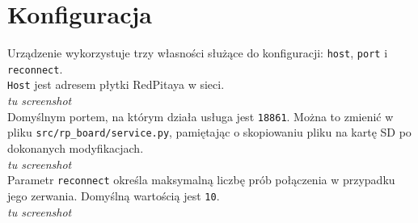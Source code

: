 \documentclass[12pt,a4paper]{article}
\begin{document}
	\section{Konfiguracja}
	Urządzenie wykorzystuje trzy własności służące do konfiguracji: \texttt{host}, \texttt{port} i \texttt{reconnect}.\\
	\texttt{Host} jest adresem płytki RedPitaya w sieci.\\
	\emph{tu screenshot}\\
	Domyślnym portem, na którym działa usługa jest \texttt{18861}. Można to zmienić w pliku \texttt{src/rp\_board/service.py}, pamiętając o skopiowaniu pliku na kartę SD po dokonanych modyfikacjach.\\
	\emph{tu screenshot}\\
	Parametr \texttt{reconnect} określa maksymalną liczbę prób połączenia w przypadku jego zerwania. Domyślną wartością jest \texttt{10}.\\
	\emph{tu screenshot}
\end{document}
